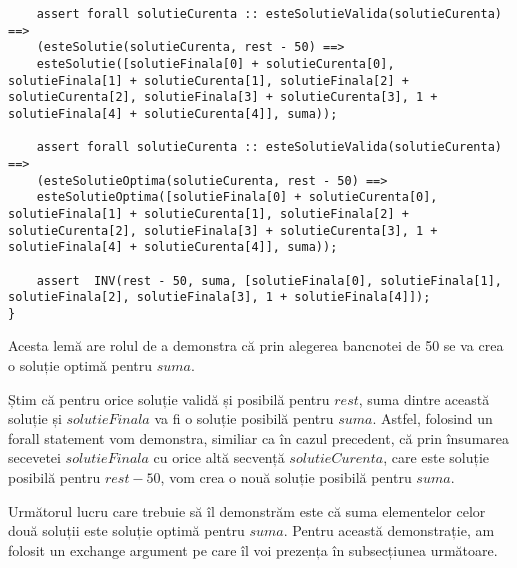 \begin{enumerate}
\begin{lstlisting}
	assert forall solutieCurenta :: esteSolutieValida(solutieCurenta) ==>
	(esteSolutie(solutieCurenta, rest - 50) ==> 
	esteSolutie([solutieFinala[0] + solutieCurenta[0], solutieFinala[1] + solutieCurenta[1], solutieFinala[2] + solutieCurenta[2], solutieFinala[3] + solutieCurenta[3], 1 + solutieFinala[4] + solutieCurenta[4]], suma));
	
	assert forall solutieCurenta :: esteSolutieValida(solutieCurenta) ==>        
	(esteSolutieOptima(solutieCurenta, rest - 50) ==> 
	esteSolutieOptima([solutieFinala[0] + solutieCurenta[0], solutieFinala[1] + solutieCurenta[1], solutieFinala[2] + solutieCurenta[2], solutieFinala[3] + solutieCurenta[3], 1 + solutieFinala[4] + solutieCurenta[4]], suma));
	
	assert  INV(rest - 50, suma, [solutieFinala[0], solutieFinala[1], solutieFinala[2], solutieFinala[3], 1 + solutieFinala[4]]);
}
\end{lstlisting}
\par 
Acesta lemă are rolul de a demonstra că prin alegerea bancnotei de 50 se va crea o soluție optimă pentru $suma$.
\par 
Știm că pentru orice soluție validă și posibilă pentru $rest$, suma dintre această soluție și $solutieFinala$ va fi o soluție posibilă pentru $suma$. Astfel, folosind un forall statement vom demonstra, similiar ca în cazul precedent, că prin însumarea secevetei $solutieFinala$ cu orice altă secvență $solutieCurenta$, care este soluție posibilă pentru $rest-50$,  vom crea o nouă soluție posibilă pentru $suma$.
\par
Următorul lucru care trebuie să îl demonstrăm este că suma elementelor celor două soluții este soluție optimă pentru $suma$. Pentru această demonstrație, am folosit un exchange argument pe care îl voi prezența în subsecțiunea următoare.



\end{enumerate}

